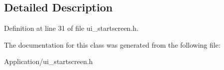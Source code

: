 \subsection{Detailed Description}


Definition at line 31 of file ui\+\_\+startscreen.\+h.



The documentation for this class was generated from the following file\+:\begin{DoxyCompactItemize}
\item 
Application/ui\+\_\+startscreen.\+h\end{DoxyCompactItemize}
